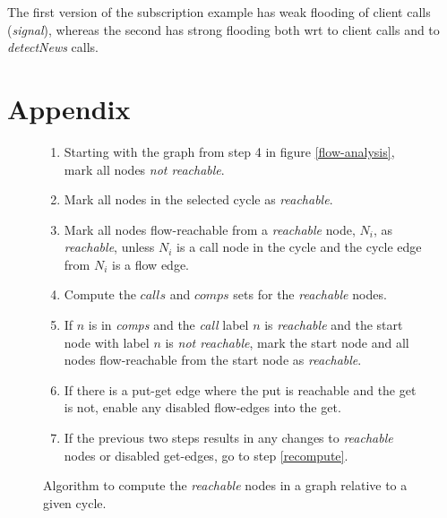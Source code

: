 \documentclass[12pt]{article}%
\begin{document}
The first version of the subscription example
has weak flooding of client calls (\emph{signal}),
whereas the second has strong flooding both wrt
to client calls and  to \emph{detectNews} calls.

\section{Appendix}

\begin{figure}
\begin{shaded}
\begin{enumerate}
\item Starting with the graph from step 4 in figure \ref{flow-analysis}, mark all nodes \emph{not reachable}.
\item Mark all nodes in the selected cycle as \emph{reachable}. 
\item Mark all nodes flow-reachable from a \emph{reachable} node, $N_i$, as \emph{reachable}, unless $N_i$ is a call node in the cycle and
the cycle edge from $N_i$ is a flow edge.
\item \label{recompute} Compute the $calls$ and $comps$ sets for the \emph{reachable} nodes.
\item If ${n}$ is in \emph{comps} and the \emph{call} label ${n}$ is \emph{reachable} and the start node with label ${n}$ is
\emph{not reachable}, mark the start node and all nodes flow-reachable from the start node as \emph{reachable}.

\item If there is a put-get edge where the put is reachable and the get is not,
enable any disabled flow-edges into the get. %

\item If the previous two steps results in any changes to \emph{reachable} nodes or disabled get-edges, go to step \ref{recompute}.
\end{enumerate}
\end{shaded}
\caption{\label{reachable-analysis}
Algorithm to compute the \emph{reachable} nodes in a graph relative to a given cycle.}
\end{figure}
\end{document}
